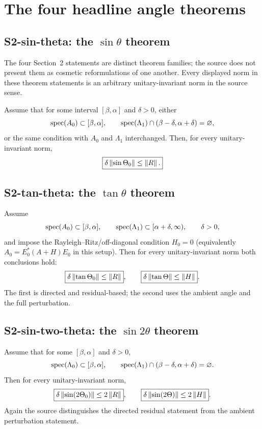 \section{The four headline angle theorems}

\subsection*{S2-sin-theta: the $\sin\theta$ theorem}
The four Section~2 statements are distinct theorem families; the source does not present them as cosmetic reformulations of one another.  Every displayed norm in these theorem statements is an arbitrary unitary-invariant norm in the source sense.

Assume that for some interval $[\beta,\alpha]$ and $\delta>0$, either
\[
 \operatorname{spec}(A_0)\subset[\beta,\alpha],
 \qquad
 \operatorname{spec}(\Lambda_1)\cap(\beta-\delta,\alpha+\delta)=\varnothing,
\]
or the same condition with $A_0$ and $\Lambda_1$ interchanged.  Then, for every unitary-invariant norm,
\[
 \boxed{\delta\left\lVert \sin\Theta_0\right\rVert\le\left\lVert R\right\rVert.}
\]

\subsection*{S2-tan-theta: the $\tan\theta$ theorem}
Assume
\[
 \operatorname{spec}(A_0)\subset[\beta,\alpha],
 \qquad
 \operatorname{spec}(\Lambda_1)\subset[\alpha+\delta,\infty),
 \qquad \delta>0,
\]
and impose the Rayleigh--Ritz/off-diagonal condition $H_0=0$ (equivalently $A_0=E_0^*(A+H)E_0$ in this setup).  Then for every unitary-invariant norm both conclusions hold:
\[
 \boxed{\delta\left\lVert \tan\Theta_0\right\rVert\le\left\lVert R\right\rVert},
 \qquad
 \boxed{\delta\left\lVert \tan\Theta\right\rVert\le\left\lVert H\right\rVert}.
\]
The first is directed and residual-based; the second uses the ambient angle and the full perturbation.

\subsection*{S2-sin-two-theta: the $\sin 2\theta$ theorem}
Assume that for some $[\beta,\alpha]$ and $\delta>0$,
\[
 \operatorname{spec}(\Lambda_0)\subset[\beta,\alpha],
 \qquad
 \operatorname{spec}(\Lambda_1)\cap(\beta-\delta,\alpha+\delta)=\varnothing.
\]
Then for every unitary-invariant norm,
\[
 \boxed{\delta\left\lVert \sin(2\Theta_0)\right\rVert\le2\left\lVert R\right\rVert},
 \qquad
 \boxed{\delta\left\lVert \sin(2\Theta)\right\rVert\le2\left\lVert H\right\rVert}.
\]
Again the source distinguishes the directed residual statement from the ambient perturbation statement.

